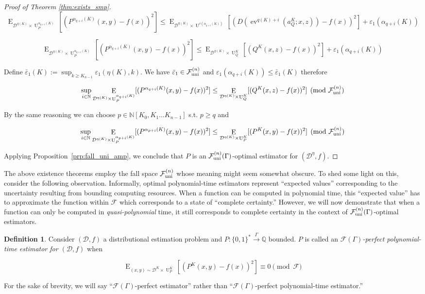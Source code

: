 \documentclass{article}
\numberwithin{equation}{section}
\theoremstyle{definition}
\newtheorem{definition}{Definition}[section]
\theoremstyle{plain}
\newcommand{\Bool}{\{0,1\}}
\newcommand{\Words}{{\Bool^*}}
\DeclareMathOperator{\E}{E}
\DeclareMathOperator{\Ev}{ev}
\DeclareMathOperator{\Un}{U}
\newcommand{\Nats}{\mathbb{N}}
\newcommand{\Rats}{\mathbb{Q}}
\newcommand{\NatPoly}{\Nats[K_0, K_1 \ldots K_{n-1}]}
\newcommand{\Dist}{\mathcal{D}}
\newcommand{\Fall}{\mathcal{F}}
\newcommand{\EG}{\Fall(\Gamma)}
\newcommand{\FallU}{{\Fall_{\textnormal{uni}}^{(n)}}}
\newcommand{\Scheme}{\xrightarrow{\Gamma}}
\begin{document}
\begin{proof}[Proof of Theorem \ref{thm:exists_smp}]
\[\E_{\Dist^{\eta(K)} \times \Un_P^{\alpha_{q+i}(K)}}[(P^{\alpha_{q+i}(K)}(x,y)-f(x))^2] \leq \E_{\Dist^{\eta(K)} \times \Un^{r(\alpha_{q+i}(K))}}[(D(\Ev^{q(K)+i}(a_Q^K;x,z))-f(x))^2] + \varepsilon_1(\alpha_{q+i}(K))\]

\[\E_{\Dist^{\eta(K)} \times \Un_P^{\alpha_{q+i}(K)}}[(P^{\alpha_{q+i}(K)}(x,y)-f(x))^2] \leq \E_{\Dist^{\eta(K)} \times \Un_Q^K}[(Q^K(x,z)-f(x))^2] + \varepsilon_1(\alpha_{q+i}(K))\]

Define ${\bar{\varepsilon}_1(K):=\sup_{k \geq K_{n-1}}\varepsilon_1(\eta(K),k)}$. We have ${\bar{\varepsilon}_1 \in \FallU}$ and ${\varepsilon_1(\alpha_{q+i}(K)) \leq \bar{\varepsilon}_1(K)}$ therefore

\[\sup_{i \in \Nats} \E_{\Dist^{\eta(K)} \times \Un_P^{\alpha_{q+i}(K)}}[(P^{\alpha_{q+i}(K)}(x,y)-f(x))^2] \leq \E_{\Dist^{\eta(K)} \times \Un_Q^K}[(Q^K(x,z)-f(x))^2] \pmod \FallU\]

By the same reasoning we can choose ${p \in \NatPoly}$ s.t. ${p \geq q}$ and

\[\sup_{i \in \Nats} \E_{ \Dist^{\eta(K)} \times \Un_P^{\alpha_{p+i}(K)}}[(P^{\alpha_{p+i}(K)}(x,y)-f(x))^2] \leq \E_{\Dist^{\eta(K)} \times \Un_P^K}[(P^K(x,y)-f(x))^2] \pmod \FallU\]

Applying Proposition~\ref{prp:fall_uni_amp}, we conclude that ${P}$ is an ${\FallU(\Gamma)}$-optimal estimator for ${(\Dist^\eta,f)}$.
%
\end{proof}

The above existence theorems employ the fall space ${\FallU}$ whose meaning might seem somewhat obscure. To shed some light on this, consider the following observation. Informally, optimal polynomial-time estimators represent \enquote{expected values} corresponding to the uncertainty resulting from bounding computing resources. When a function can be computed in polynomial time, this \enquote{expected value} has to approximate the function within ${\Fall}$ which corresponds to a state of \enquote{complete certainty.} However, we will now demonstrate that when a function can only be computed in \emph{quasi-polynomial} time, it still corresponds to complete certainty in the context of ${\FallU(\Gamma)}$-optimal estimators.

\begin{samepage}
\begin{definition}

Consider ${(\Dist, f)}$ a distributional estimation problem and ${P: \Words \Scheme \Rats}$ bounded. ${P}$ is called an \emph{${\EG}$-perfect polynomial-time estimator for ${(\Dist,f)}$} when 

\begin{equation}
\E_{(x,y) \sim \Dist^K \times \Un_P^K}[(P^K(x,y)-f(x))^2] \equiv 0 \pmod \Fall
\end{equation}

For the sake of brevity, we will say \enquote{${\EG}$-perfect estimator} rather than \enquote{${\EG}$-perfect polynomial-time estimator.}

\end{definition}
\end{samepage}
\end{document}
